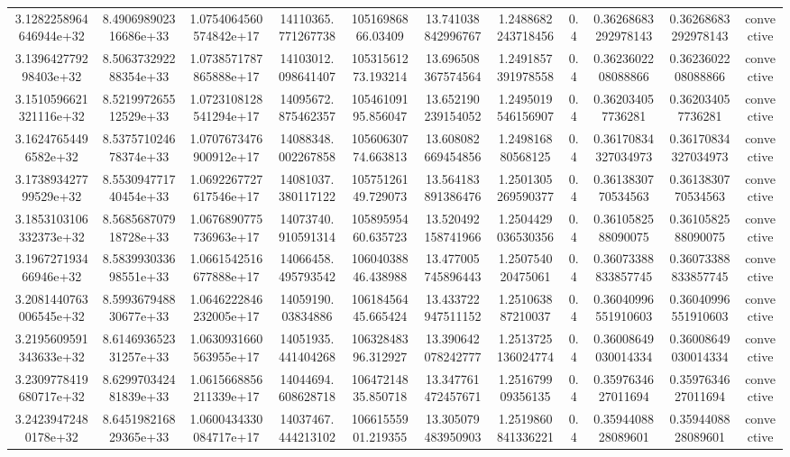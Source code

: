 \begin{table}
\begin{tabular}{ccccccccccc}
3.1282258964646944e+32 & 8.490698902316686e+33 & 1.0754064560574842e+17 & 14110365.771267738 & 10516986866.03409 & 13.741038842996767 & 1.2488682243718456 & 0.4 & 0.36268683292978143 & 0.36268683292978143 & convective \\
3.139642779298403e+32 & 8.506373292288354e+33 & 1.0738571787865888e+17 & 14103012.098641407 & 10531561273.193214 & 13.696508367574564 & 1.2491857391978558 & 0.4 & 0.3623602208088866 & 0.3623602208088866 & convective \\
3.1510596621321116e+32 & 8.521997265512529e+33 & 1.0723108128541294e+17 & 14095672.875462357 & 10546109195.856047 & 13.652190239154052 & 1.2495019546156907 & 0.4 & 0.362034057736281 & 0.362034057736281 & convective \\
3.16247654496582e+32 & 8.537571024678374e+33 & 1.0707673476900912e+17 & 14088348.002267858 & 10560630774.663813 & 13.608082669454856 & 1.249816880568125 & 0.4 & 0.36170834327034973 & 0.36170834327034973 & convective \\
3.173893427799529e+32 & 8.553094771740454e+33 & 1.0692267727617546e+17 & 14081037.380117122 & 10575126149.729073 & 13.564183891386476 & 1.2501305269590377 & 0.4 & 0.3613830770534563 & 0.3613830770534563 & convective \\
3.1853103106332373e+32 & 8.568568707918728e+33 & 1.0676890775736963e+17 & 14073740.910591314 & 10589595460.635723 & 13.520492158741966 & 1.2504429036530356 & 0.4 & 0.3610582588090075 & 0.3610582588090075 & convective \\
3.196727193466946e+32 & 8.583993033698551e+33 & 1.0661542516677888e+17 & 14066458.495793542 & 10604038846.438988 & 13.477005745896443 & 1.250754020475061 & 0.4 & 0.36073388833857745 & 0.36073388833857745 & convective \\
3.2081440763006545e+32 & 8.599367948830677e+33 & 1.0646222846232005e+17 & 14059190.03834886 & 10618456445.665424 & 13.433722947511152 & 1.251063887210037 & 0.4 & 0.36040996551910603 & 0.36040996551910603 & convective \\
3.2195609591343633e+32 & 8.614693652331257e+33 & 1.0630931660563955e+17 & 14051935.441404268 & 10632848396.312927 & 13.390642078242777 & 1.2513725136024774 & 0.4 & 0.36008649030014334 & 0.36008649030014334 & convective \\
3.2309778419680717e+32 & 8.629970342481839e+33 & 1.0615668856211339e+17 & 14044694.608628718 & 10647214835.850718 & 13.347761472457671 & 1.251679909356135 & 0.4 & 0.3597634627011694 & 0.3597634627011694 & convective \\
3.24239472480178e+32 & 8.645198216829365e+33 & 1.0600434330084717e+17 & 14037467.444213102 & 10661555901.219355 & 13.305079483950903 & 1.2519860841336221 & 0.4 & 0.3594408828089601 & 0.3594408828089601 & convective \\

\end{tabular}
\end{table}
